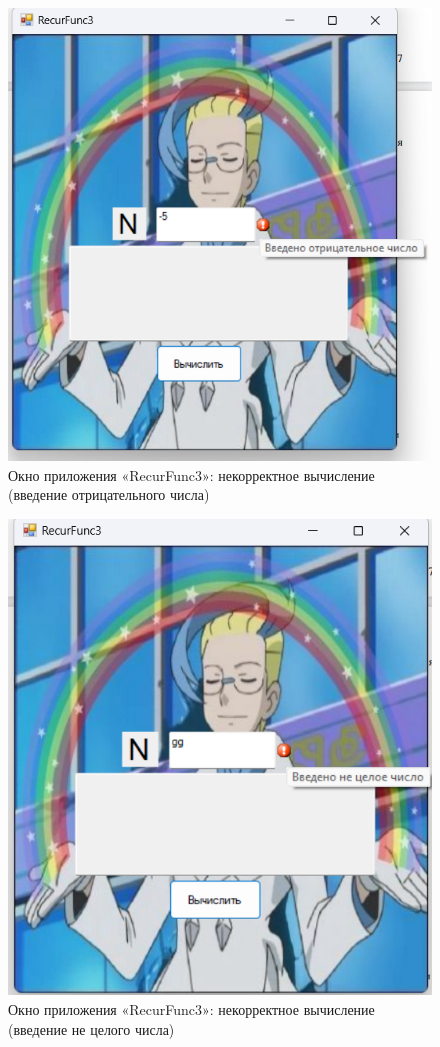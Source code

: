 \documentclass[bachelor, och, pract, times]{SCWorks}
\begin{document}
\begin{figure}[H]
    \centering
    \includegraphics[scale=0.7]{Скрины/Снимок экрана 2025-01-03 222426.png}
    \caption{Окно приложения «RecurFunc3»: некорректное вычисление
    (введение отрицательного числа)}\label{fig:recur-05}
\end{figure}


\begin{figure}[H]
    \centering
    \includegraphics[scale=0.7]{Скрины/Снимок экрана 2025-01-03 222451.png}
    \caption{Окно приложения «RecurFunc3»: некорректное вычисление
    (введение не целого числа)}\label{fig:recur-06}
\end{figure}
\end{document}
